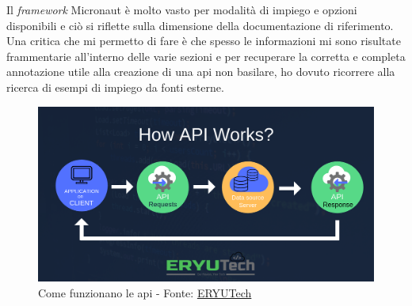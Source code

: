 Il \textit{framework} Micronaut è molto vasto per modalità di impiego e opzioni disponibili e ciò si riflette sulla dimensione della documentazione di riferimento.
Una critica che mi permetto di fare è che spesso le informazioni mi sono risultate frammentarie all'interno delle varie sezioni e per recuperare la corretta e completa annotazione utile alla creazione di una \acrshort{api} non basilare, ho dovuto ricorrere alla ricerca di esempi di impiego da fonti esterne.
\vspace{35pt}
\begin{figure}[H]
    \centering
    \includegraphics[width=0.9\columnwidth]{immagini/how_api_works.png}
    \caption{Come funzionano le \acrshort{api} - Fonte: \href{https://www.facebook.com/eryutech/photos/application-programming-interface-apihow-it-works-eryutech/1125855790904330/}{ERYUTech}}
    \label{fig:howApiWorks}
\end{figure}
\newpage
